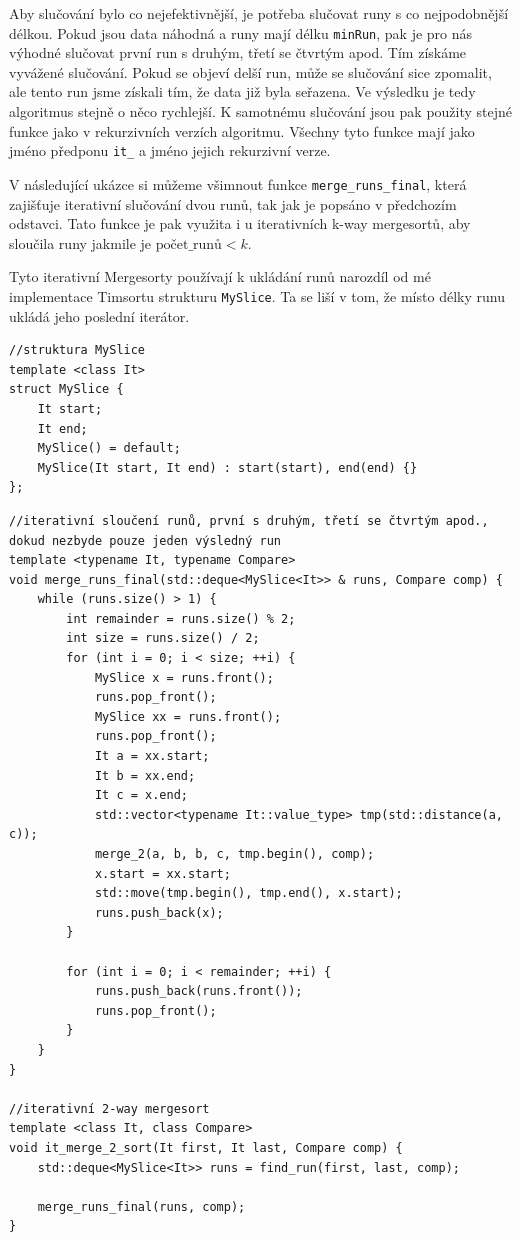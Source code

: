 \documentclass[thesis=B,czech]{FITthesis}[2019/12/23]
\begin{document}
Aby slučování bylo co nejefektivnější, je potřeba slučovat runy s co nejpodobnější délkou. Pokud jsou data náhodná a runy mají délku \texttt{minRun}, pak je pro nás výhodné slučovat první run s druhým, třetí se čtvrtým apod. Tím získáme vyvážené slučování. Pokud se objeví delší run, může se slučování sice zpomalit, ale tento run jsme získali tím, že data již byla seřazena. Ve výsledku je tedy algoritmus stejně o něco rychlejší. K samotnému slučování jsou pak použity stejné funkce jako v rekurzivních verzích algoritmu. Všechny tyto funkce mají jako jméno předponu \texttt{it\_} a jméno jejich rekurzivní verze.

V následující ukázce si můžeme všimnout funkce \texttt{merge\_runs\_final}, která zajišťuje iterativní slučování dvou runů, tak jak je popsáno v předchozím odstavci. Tato funkce je pak využita i u iterativních k-way mergesortů, aby sloučila runy jakmile je $ \textrm{počet\_runů} < k $.

Tyto iterativní Mergesorty používají k ukládání runů narozdíl od mé implementace Timsortu strukturu \texttt{MySlice}. Ta se liší v tom, že místo délky runu ukládá jeho poslední iterátor. 

\begin{verbatim}
//struktura MySlice
template <class It>
struct MySlice {
    It start;
    It end;
    MySlice() = default;
    MySlice(It start, It end) : start(start), end(end) {}
};
\end{verbatim}

\begin{verbatim}
//iterativní sloučení runů, první s druhým, třetí se čtvrtým apod., dokud nezbyde pouze jeden výsledný run
template <typename It, typename Compare>
void merge_runs_final(std::deque<MySlice<It>> & runs, Compare comp) {
    while (runs.size() > 1) {
        int remainder = runs.size() % 2;
        int size = runs.size() / 2;
        for (int i = 0; i < size; ++i) {
            MySlice x = runs.front();
            runs.pop_front();
            MySlice xx = runs.front();
            runs.pop_front();
            It a = xx.start;
            It b = xx.end;
            It c = x.end;
            std::vector<typename It::value_type> tmp(std::distance(a, c));
            merge_2(a, b, b, c, tmp.begin(), comp);
            x.start = xx.start;
            std::move(tmp.begin(), tmp.end(), x.start);
            runs.push_back(x);
        }

        for (int i = 0; i < remainder; ++i) {
            runs.push_back(runs.front());
            runs.pop_front();
        }
    }
}

//iterativní 2-way mergesort
template <class It, class Compare>
void it_merge_2_sort(It first, It last, Compare comp) {
    std::deque<MySlice<It>> runs = find_run(first, last, comp);

    merge_runs_final(runs, comp);
}
\end{verbatim}
\end{document}
